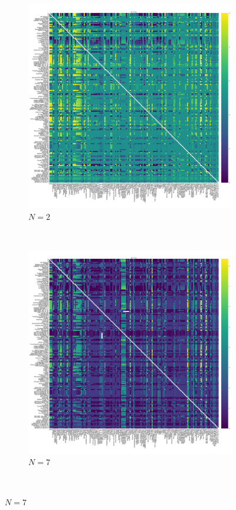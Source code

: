 \documentclass{article}
\begin{document}
\begin{figure}[!hbtp]
    \centering
    \begin{subfigure}[t]{.3\textwidth}
        \centering
        \includegraphics[width=.8\textwidth]{../img/fixation_heatmap_2_invade.pdf}
        \caption{\(N=2\)}
    \end{subfigure}%
    ~
    \begin{subfigure}[t]{.3\textwidth}
        \centering
        \includegraphics[width=.8\textwidth]{../img/fixation_heatmap_7_invade.pdf}
        \caption{\(N=7\)}
    \end{subfigure}%
    ~

\end{figure}
\end{document}
